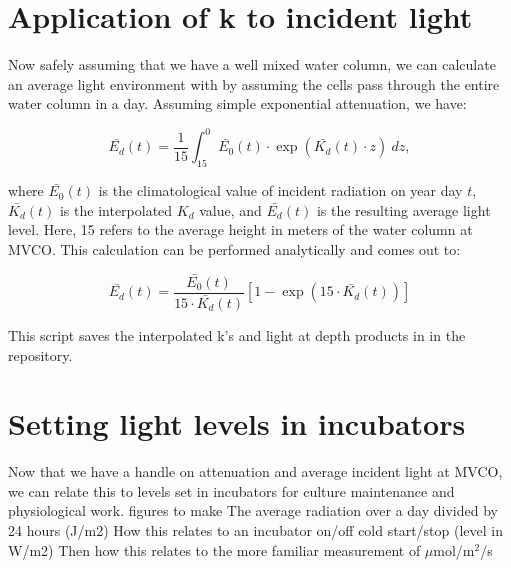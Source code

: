 \documentclass[11pt]{article}
\begin{document}
\clearpage
\section{Application of k to incident light}

Now safely assuming that we have a well mixed water column, we can calculate an average light environment with  by assuming the cells pass through the entire water column in a day. Assuming simple exponential attenuation, we have:

\begin{equation}
\bar{E_d}(t) = \frac{1}{15} \int_{15}^{0} \bar{E_0}(t) \cdot \exp(\bar{K_d}(t) \cdot z)~dz,
\end{equation}

\noindent where $\bar{E_0}(t)$ is the climatological value of incident radiation on year day $t$, $\bar{K_d}(t)$ is the interpolated $K_d$ value, and $\bar{E_d}(t)$ is the resulting average light level. Here, 15 refers to the average height in meters of the water column at MVCO.
This calculation can be performed analytically and comes out to:

\begin{equation}
\bar{E_d}(t) = \frac{\bar{E_0}(t)}{15 \cdot \bar{K_d}(t)} \left[ 1 - \exp(15 \cdot \bar{K_d}(t)) \right]
\end{equation}

\noindent This script saves the interpolated k's and light at depth products in  in the repository.

\section{Setting light levels in incubators}

Now that we have a handle on attenuation and average incident light at MVCO, we can relate this to levels set in incubators for culture maintenance and physiological work. 
figures to make
The average radiation over a day divided by 24 hours (J/m2)
How this relates to an incubator on/off cold start/stop (level in W/m2)
Then how this relates to the more familiar measurement of $\mu$mol/m$^2$/s
\end{document}
